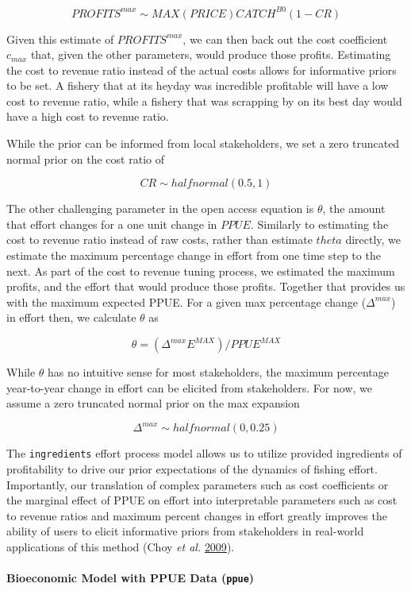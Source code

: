 \documentclass[twoside,12pt,final]{ucthesis-CA2012}
\begin{document}
\begin{ucmainmatter}
\[PROFITS^{max} \sim  MAX(PRICE)CATCH^{B0}(1 - CR) \]

Given this estimate of \(PROFITS^{max}\), we can then back out the cost
coefficient \(c_{max}\) that, given the other parameters, would produce
those profits. Estimating the cost to revenue ratio instead of the
actual costs allows for informative priors to be set. A fishery that at
its heyday was incredible profitable will have a low cost to revenue
ratio, while a fishery that was scrapping by on its best day would have
a high cost to revenue ratio.

While the prior can be informed from local stakeholders, we set a zero
truncated normal prior on the cost ratio of

\[CR \sim halfnormal(0.5,1)\]

The other challenging parameter in the open access equation is
\(\theta\), the amount that effort changes for a one unit change in
\(PPUE\). Similarly to estimating the cost to revenue ratio instead of
raw costs, rather than estimate \(theta\) directly, we estimate the
maximum percentage change in effort from one time step to the next. As
part of the cost to revenue tuning process, we estimated the maximum
profits, and the effort that would produce those profits. Together that
provides us with the maximum expected PPUE. For a given max percentage
change (\(\Delta^{max}\)) in effort then, we calculate \(\theta\) as

\[\theta = (\Delta^{max}  E^{MAX}) / PPUE^{MAX}\]

While \(\theta\) has no intuitive sense for most stakeholders, the
maximum percentage year-to-year change in effort can be elicited from
stakeholders. For now, we assume a zero truncated normal prior on the
max expansion

\[\Delta^{max} \sim halfnormal(0,0.25)\]

The \texttt{ingredients} effort process model allows us to utilize
provided ingredients of profitability to drive our prior expectations of
the dynamics of fishing effort. Importantly, our translation of complex
parameters such as cost coefficients or the marginal effect of PPUE on
effort into interpretable parameters such as cost to revenue ratios and
maximum percent changes in effort greatly improves the ability of users
to elicit informative priors from stakeholders in real-world
applications of this method (Choy \emph{et al.}
\protect\hyperlink{ref-Choy2009}{2009}).

\paragraph{\texorpdfstring{Bioeconomic Model with PPUE Data
(\texttt{ppue})}{Bioeconomic Model with PPUE Data (ppue)}}\label{bioeconomic-model-with-ppue-data-ppue}


\end{ucmainmatter}
\end{document}

